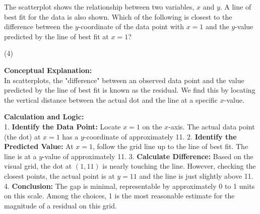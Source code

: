 \documentclass[11pt,paper=a4,answers]{exam}
\begin{document}
\begin{questions}
\pointsinrightmargin
\pointsdroppedatright
\marksnotpoints
{}
\pointformat{\boldmath\themarginpoints}
\bracketedpoints


\question
\begin{center}
\end{center}
The scatterplot shows the relationship between two variables, $x$ and $y$. A line of best fit for the data is also shown. Which of the following is closest to the difference between the $y$-coordinate of the data point with $x = 1$ and the $y$-value predicted by the line of best fit at $x = 1$?
\begin{tasks}(4)
\end{tasks}

\begin{solution}
\textbf{Conceptual Explanation:} \\
In scatterplots, the "difference" between an observed data point and the value predicted by the line of best fit is known as the residual. We find this by locating the vertical distance between the actual dot and the line at a specific $x$-value.

\vspace{30pt}

\textbf{Calculation and Logic:} \\
1. \textbf{Identify the Data Point:} Locate $x = 1$ on the $x$-axis. The actual data point (the dot) at $x = 1$ has a $y$-coordinate of approximately 11.
2. \textbf{Identify the Predicted Value:} At $x = 1$, follow the grid line up to the line of best fit. The line is at a $y$-value of approximately 11.
3. \textbf{Calculate Difference:} Based on the visual grid, the dot at $(1, 11)$ is nearly touching the line. However, checking the closest points, the actual point is at $y = 11$ and the line is just slightly above 11.
4. \textbf{Conclusion:} The gap is minimal, representable by approximately 0 to 1 units on this scale. Among the choices, 1 is the most reasonable estimate for the magnitude of a residual on this grid.


\end{solution}
\end{questions}
\end{document}
